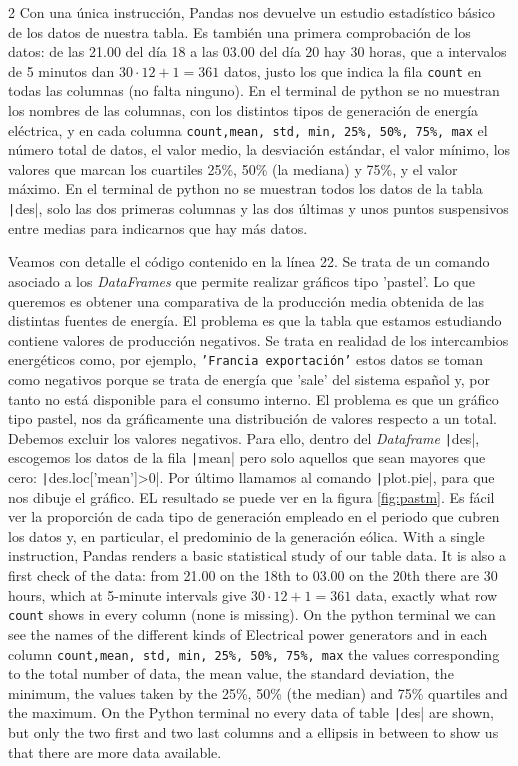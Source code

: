 \begin{paracol}{2}
Con una única instrucción, Pandas nos devuelve un estudio estadístico básico de los datos de nuestra tabla. Es también una primera comprobación de los datos: de las 21.00 del día 18 a las 03.00 del día 20 hay 30 horas, que a intervalos de 5 minutos dan $30\cdot 12+1=361$ datos, justo los que indica la fila \texttt{count} en todas las columnas (no falta ninguno). En el terminal de python se no muestran los nombres de las columnas, con los distintos tipos de generación de energía eléctrica, y en cada columna \texttt{count,mean, std, min, 25\%, 50\%, 75\%, max} el nú\-mero total de datos, el valor medio, la desviación estándar, el valor mínimo, los valores que marcan los cuartiles 25\%, 50\% (la mediana) y 75\%, y el valor máximo.  En el terminal de python no se muestran todos los datos de la tabla \texttt|des|, solo las dos primeras columnas y las dos últimas y unos puntos suspensivos entre medias para indicarnos que hay más datos. 

Veamos con detalle el código contenido en la línea 22. Se trata de un comando asociado a los \emph{DataFrames} que permite realizar gráficos tipo 'pastel'. Lo que queremos es obtener una comparativa de la producción media obtenida de las distintas fuentes de energía. El problema es que la tabla que estamos estudiando contiene valores de producción negativos. Se trata en realidad de los intercambios energéticos como, por ejemplo, \texttt{'Francia exportación'} estos datos se toman como negativos porque se trata de energía que 'sale' del sistema español y, por tanto no está disponible para el consumo interno. El problema es que un gráfico tipo pastel, nos da gráficamente una distribución de valores respecto a un total. Debemos excluir los valores negativos. Para ello, dentro del \emph{Dataframe} \texttt|des|, escogemos los datos de la fila \texttt|mean| pero solo aquellos que sean mayores que cero: \texttt|des.loc['mean']>0|. Por último llamamos al comando \texttt|plot.pie|, para que nos dibuje el gráfico. EL resultado se puede ver en la figura \ref{fig:pastm}. Es fácil ver la proporción de cada tipo de generación empleado en el periodo que cubren los datos y, en particular, el predominio de la generación eólica.
\switchcolumn
With a single instruction, Pandas renders a basic statistical study of our table data. It is also a first check of the data: from 21.00 on the 18th to 03.00 on the 20th there are 30 hours, which at 5-minute intervals give $30\cdot 12+1=361$ data, exactly what row \texttt{count} shows in every column (none is missing). On the python terminal we can see the names of the different kinds of Electrical power generators and in each column \texttt{count,mean, std, min, 25\%, 50\%, 75\%, max} the values corresponding to the total number of data, the mean value, the standard deviation, the minimum, the values taken by the 25\%, 50\% (the  median) and 75\% quartiles and the maximum. On the Python terminal no every data of table  \texttt|des| are shown, but only the two first and two last columns and a ellipsis in between to show us that there are more data available.


\end{paracol}
